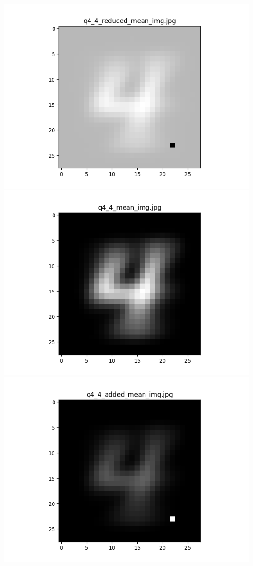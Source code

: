 \documentclass{article}
\begin{document}
    \\
    \includegraphics[scale=.37]{../results/q4/reduced_mean_images/q4_4_reduced_mean_img.png}
    \includegraphics[scale=.37]{../results/q4/mean_images/q4_4_mean_img.png}
    \includegraphics[scale=.37]{../results/q4/added_mean_images/q4_4_added_mean_img.png}
\end{document}
